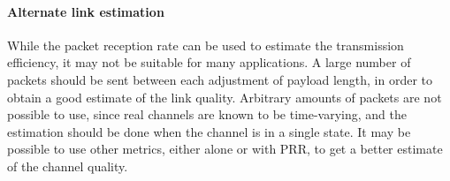 \paragraph{Alternate link estimation} While the packet reception rate can be used to estimate the transmission efficiency, it may not be suitable for many applications. A large number of packets should be sent between each adjustment of payload length, in order to obtain a good estimate of the link quality. Arbitrary amounts of packets are not possible to use, since real channels are known to be time-varying, and the estimation should be done when the channel is in a single state. It may be possible to use other metrics, either alone or with PRR, to get a better estimate of the channel quality.
